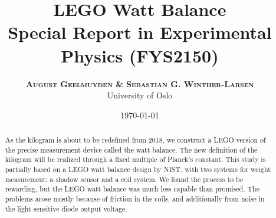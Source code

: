 \documentclass[twoside]{article}
\title{\vspace{-15mm}\fontsize{24pt}{10pt}\selectfont\textbf{
LEGO Watt Balance \\ 
\normalsize Special Report in Experimental Physics (FYS2150)
}} %
\author{
\large
\textsc{\textbf{August Geelmuyden \& Sebastian G. Winther-Larsen}} \\
\normalsize University of Oslo \\ %
\vspace{-5mm}
}
\date{\today}
\begin{document}
\maketitle %


\small
\begin{abstract}
\noindent

As the kilogram is about to be redefined from 2018, we construct a
LEGO version of the precise measurement device called the watt
balance. The new definition of the kilogram will be realized through a
fixed multiple of Planck's constant. This study is partially based on
a LEGO watt balance design by NIST, with two systems for weight measurement; a shadow sensor and a coil system. 
We found the process to be rewarding, but the LEGO watt balance was much less capable than promised. The problems arose mostly because of friction in the coils, and additionally from noise in the light sensitive diode output voltage. 
\end{abstract}


\begin{multicols}{2}
\begingroup
\let\clearpage\relax







\endgroup

\end{multicols}
\end{document}
